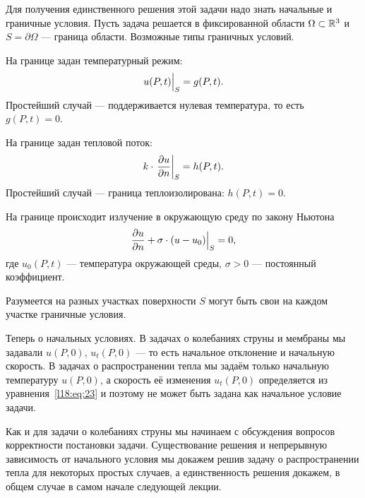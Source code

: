 Для получения единственного решения этой задачи надо знать начальные и граничные условия. Пусть задача решается в фиксированной области $\Omega\subset\mathbb{R}^3$ и $S=\partial\Omega$ --- граница области. Возможные типы граничных условий.
\begin{enumerateD}
	\item На границе задан температурный режим:
	\begin{equation*}
		\hfill u(P,t)\Big|_{S}=g(P,t).\hfill
	\end{equation*}
	Простейший случай --- поддерживается нулевая температура, то есть $g(P,t)=0$.
	
	\item На границе задан тепловой поток:
	\begin{equation*}
		\hfill k\cdot\left.\pder{u}{n}\right|_{S}=h(P,t).\hfill
	\end{equation*}
	Простейший случай --- граница теплоизолирована: $h(P,t)=0$.
	
	\item На границе происходит излучение в окружающую среду по закону Ньютона
	\begin{equation*}
		\hfill \pder{u}{n}+\sigma\cdot(u-u_0)\Big|_{S}=0,\hfill
	\end{equation*}
	где $u_0(P,t)$ --- температура окружающей среды, $\sigma>0$ --- постоянный коэффициент.
\end{enumerateD} 
Разумеется на разных участках поверхности $S$ могут быть свои на каждом участке граничные условия.

Теперь о начальных условиях. В задачах о колебаниях струны и мембраны мы задавали $u(P,0)$, $u_t(P,0)$ --- то есть начальное отклонение и начальную скорость. В задачах о распространении тепла мы задаём только начальную температуру $u(P,0)$, а скорость её изменения $u_t(P,0)$ определяется из уравнения~\eqref{l18:eq:23} и поэтому не может быть задана как начальное условие задачи.

Как и для задачи о колебаниях струны мы начинаем с обсуждения вопросов корректности постановки задачи. Существование решения и непрерывную зависимость от начального условия мы докажем решив задачу о распространении тепла для некоторых простых случаев, а единственность решения докажем, в общем случае в самом начале следующей лекции. 